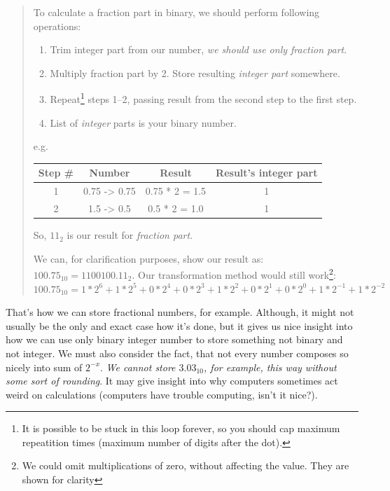 \documentclass{report}
\begin{document}
            \begin{quote}
                To calculate a fraction part in binary, we should perform following operations:

                \begin{enumerate}
                    \item Trim integer part from our number, \emph{we should use only fraction part}.
                    \item Multiply fraction part by 2. Store resulting \emph{integer part} somewhere.
                    \item Repeat\footnote{It is possible to be stuck in this loop forever, so you should cap maximum repeatition times (maximum number of digits after the dot).} steps 1--2, passing result from the second step to the first step.
                    \item List of \emph{integer} parts is your binary number.
                \end{enumerate}

                e.g.\\
                \begin{longtable}{|c|c|c|c|}
                    \hline
                    Step \# & Number & Result & Result's integer part \\\hline
                    1 & 0.75 -> 0.75 & 0.75 * 2 = 1.5 & 1 \\\hline
                    2 & 1.5 -> 0.5 & 0.5 * 2 = 1.0 & 1 \\\hline                    
                \end{longtable}

                So, $11_2$ is our result for \emph{fraction part}.

                We can, for clarification purposes, show our result as: $100.75_{10} = 1100100.11_2$. Our transformation method 
                would still work\footnote{We could omit multiplications of zero, without affecting the value. They are shown for clarity}: \\

                $100.75_{10} = 1 * 2^6 + 1 * 2^5 + 0 * 2^4 + 0 * 2^3 + 1 * 2^2 + 0 * 2^1 + 0 * 2^0 + 1 * 2^{-1} + 1 * 2^{-2}$ 
            \end{quote}

            That's how we can store fractional numbers, for example. Although, it might not usually be the only and exact case how it's done, but it gives us nice insight
            into how we can use only binary integer number to store something not binary and not integer. We must also consider the fact, that not every number composes
            so nicely into sum of $2^{-x}$. \emph{We cannot store $3.03_{10}$, for example, this way without some sort of rounding}. It may give insight into why computers
            sometimes act weird on calculations (computers have trouble computing, isn't it nice?). \par
\end{document}
